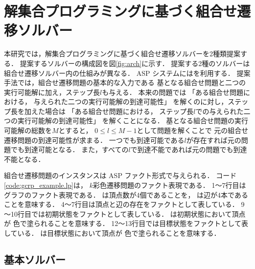 ﻿%
\section{解集合プログラミングに基づく組合せ遷移ソルバー} \label{chap:proposal}


本研究では，解集合プログラミングに基づく組合せ遷移ソルバーを2種類提案する．
提案するソルバーの構成図を図\ref{fig:arch}に示す．
提案する2種のソルバーは組合せ遷移ソルバー内の仕組みが異なる．
ASP システムには{\clingo}を利用する．
提案手法では，組合せ遷移問題の基本的な入力である
基となる組合せ問題と二つの実行可能解に加え，ステップ長$l$も与える．
本来の問題では
「ある組合せ問題における，
与えられた二つの実行可能解の到達可能性」
を解くのに対し，ステップ長を加えた場合は
「ある組合せ問題における，
ステップ長$l$での与えられた二つの実行可能解の到達可能性」
を解くことになる．
基となる組合せ問題の実行可能解の総数を$M$とすると，
$0 \le l \le M-1$として問題を解くことで
元の組合せ遷移問題の到達可能性が求まる．
一つでも到達可能である$l$が存在すれば元の問題でも到達可能となる．
また，すべての$l$で到達不能であれば元の問題でも到達不能となる．

組合せ遷移問題のインスタンスは ASP ファクト形式で与えられる．
コード\ref{code:gcrp_example.lp}は，
$k$彩色遷移問題のファクト表現である．
1～7行目はグラフのファクト表現である．
は頂点数が4個であることを，
は辺が4本であることを意味する．
4～7行目は頂点と辺の存在をファクトとして表している．
9～10行目では初期状態をファクトとして表している．
は初期状態において頂点が
色で塗られることを意味する．
12～13行目では目標状態をファクトとして表している．
は目標状態において頂点が
色で塗られることを意味する．



\subsection{基本ソルバー} \label{sec:based_solver}

